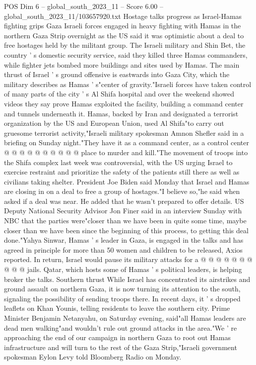 \begin{textsample}{POS Dim 6 – global\_south\_2023\_11 – Score 6.00 – global\_south\_2023\_11/103657920.txt}  \label{ex:f6_pos_304}
Hostage talks progress as Israel-Hamas fighting grips Gaza Israeli forces engaged in heavy fighting with Hamas in the northern Gaza Strip overnight as the US said it was optimistic about a deal to free hostages held by the militant group.
The Israeli military and Shin Bet, the country ' s domestic security service, said they killed three Hamas commanders, while fighter jets bombed more buildings and sites used by Hamas.
The main thrust of Israel ' s ground offensive is eastwards into Gaza City, which the military describes as Hamas ' s"center of gravity."Israeli forces have taken control of many parts of the city ' s Al Shifa hospital and over the weekend showed videos they say prove Hamas exploited the facility, building a command center and tunnels underneath it.
Hamas, backed by Iran and designated a terrorist organization by the US and European Union, used Al Shifa"to carry out gruesome terrorist activity,"Israeli military spokesman Amnon Shefler said in a briefing on Sunday night."They have it as a command center, as a control center @ @ @ @ @ @ @ @ @ @ place to murder and kill."The movement of troops into the Shifa complex last week was controversial, with the US urging Israel to exercise restraint and prioritize the safety of the patients still there as well as civilians taking shelter.
President Joe Biden said Monday that Israel and Hamas are closing in on a deal to free a group of hostages."I believe so,"he said when asked if a deal was near.
He added that he wasn't prepared to offer details.
US Deputy National Security Advisor Jon Finer said in an interview Sunday with NBC that the parties were"closer than we have been in quite some time, maybe closer than we have been since the beginning of this process, to getting this deal done."Yahya Sinwar, Hamas ' s leader in Gaza, is engaged in the talks and has agreed in principle for more than 50 women and children to be released, Axios reported.
In return, Israel would pause its military attacks for a @ @ @ @ @ @ @ @ @ @ jails.
Qatar, which hosts some of Hamas ' s political leaders, is helping broker the talks.
Southern thrust While Israel has concentrated its airstrikes and ground assault on northern Gaza, it is now turning its attention to the south, signaling the possibility of sending troops there.
In recent days, it ' s dropped leaflets on Khan Younis, telling residents to leave the southern city.
Prime Minister Benjamin Netanyahu, on Saturday evening, said"all Hamas leaders are dead men walking"and wouldn't rule out ground attacks in the area."We ' re approaching the end of our campaign in northern Gaza to root out Hamas infrastructure and will turn to the rest of the Gaza Strip,"Israeli government spokesman Eylon Levy told Bloomberg Radio on Monday.

\end{textsample}

